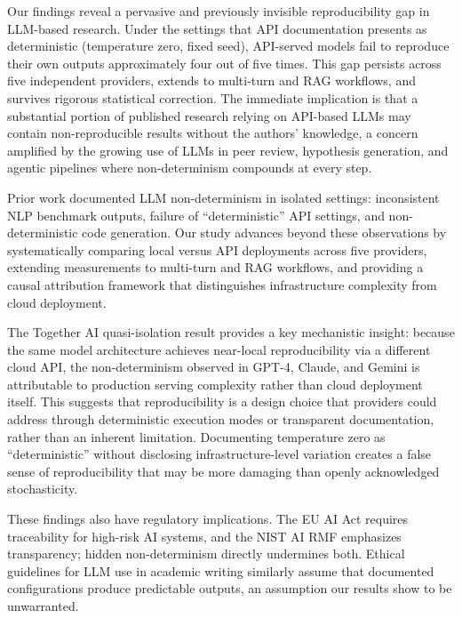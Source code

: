 \documentclass[sn-nature]{sn-jnl}
\begin{document}
Our findings reveal a pervasive and previously invisible reproducibility gap in LLM-based research.
Under the settings that API documentation presents as deterministic (temperature zero, fixed seed), API-served models fail to reproduce their own outputs approximately four out of five times.
This gap persists across five independent providers, extends to multi-turn and RAG workflows, and survives rigorous statistical correction.
The immediate implication is that a substantial portion of published research relying on API-based LLMs may contain non-reproducible results without the authors' knowledge, a concern amplified by the growing use of LLMs in peer review\cite{thakkar2026llm}, hypothesis generation\cite{xin2025agentic}, and agentic pipelines where non-determinism compounds at every step.

Prior work documented LLM non-determinism in isolated settings: inconsistent NLP benchmark outputs\cite{chen2023chatgpt}, failure of ``deterministic'' API settings\cite{atil2024nondeterminism}, and non-deterministic code generation\cite{ouyang2024nondeterminism}.
Our study advances beyond these observations by systematically comparing local versus API deployments across five providers, extending measurements to multi-turn and RAG workflows, and providing a causal attribution framework that distinguishes infrastructure complexity from cloud deployment.

The Together AI quasi-isolation result provides a key mechanistic insight: because the same model architecture achieves near-local reproducibility via a different cloud API, the non-determinism observed in GPT-4, Claude, and Gemini is attributable to production serving complexity rather than cloud deployment itself.
This suggests that reproducibility is a design choice that providers could address through deterministic execution modes or transparent documentation, rather than an inherent limitation.
Documenting temperature zero as ``deterministic'' without disclosing infrastructure-level variation creates a false sense of reproducibility that may be more damaging than openly acknowledged stochasticity.

These findings also have regulatory implications.
The EU AI Act\cite{euaiact2024} requires traceability for high-risk AI systems, and the NIST AI RMF\cite{nist2023ai} emphasizes transparency; hidden non-determinism directly undermines both.
Ethical guidelines for LLM use in academic writing\cite{porsdam2024ethics} similarly assume that documented configurations produce predictable outputs, an assumption our results show to be unwarranted.
\end{document}
